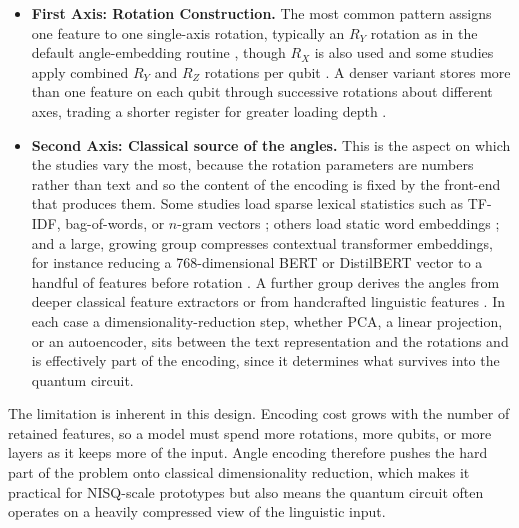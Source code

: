 \documentclass{ieeeaccess}
\begin{document}
\begin{itemize}
    \item \textbf{First Axis: Rotation Construction.} The most common pattern assigns one feature to one single-axis rotation, typically an $R_Y$ rotation as in the default angle-embedding routine \cite{ruskanda_evaluating_2025,kesiku_quantum_2025,diaz-ortiz_strongly_2024}, though $R_X$ is also used \cite{day_qnet_2023,zhou_new_2022,tiwari_quantum_2024} and some studies apply combined $R_Y$ and $R_Z$ rotations per qubit \cite{stein_applying_2023}. A denser variant stores more than one feature on each qubit through successive rotations about different axes, trading a shorter register for greater loading depth \cite{kesiku_unlocking_2026}.
    \item \textbf{Second Axis: Classical source of the angles.} This is the aspect on which the studies vary the most, because the rotation parameters are numbers rather than text and so the content of the encoding is fixed by the front-end that produces them. Some studies load sparse lexical statistics such as TF-IDF, bag-of-words, or $n$-gram vectors \cite{boopalamani_quantum-enhanced_2025,payares_quantum_2023,kabir_qtopic_2026}; others load static word embeddings \cite{di_sipio_dawn_2022,diaz-ortiz_strongly_2024,ohno_quantum_2025}; and a large, growing group compresses contextual transformer embeddings, for instance reducing a 768-dimensional BERT or DistilBERT vector to a handful of features before rotation \cite{ahmad_hybrid_2023,kumar_hybrid_2026,suleiman_hdqe_2026,yu_application_2024}. A further group derives the angles from deeper classical feature extractors or from handcrafted linguistic features \cite{rezaei_hybrid_2026,mukesh_qvila_2024,mompelat_compact_2026}. In each case a dimensionality-reduction step, whether PCA, a linear projection, or an autoencoder, sits between the text representation and the rotations and is effectively part of the encoding, since it determines what survives into the quantum circuit.
\end{itemize}

The limitation is inherent in this design. Encoding cost grows with the number of retained features, so a model must spend more rotations, more qubits, or more layers as it keeps more of the input. Angle encoding therefore pushes the hard part of the problem onto classical dimensionality reduction, which makes it practical for NISQ-scale prototypes but also means the quantum circuit often operates on a heavily compressed view of the linguistic input.
\end{document}

